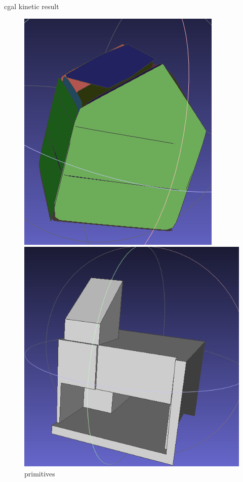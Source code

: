 \documentclass[10pt]{beamer}
\begin{document}
\begin{frame}{cgal kinetic result }
    \begin{figure}[H]
        \centering
        \begin{minipage}[t]{0.35\textwidth}
          \includegraphics[width=\textwidth]{../../images/screen_kinetic/ACJasmin_primitive_cgal.png}
          \caption*{primitives}
        \end{minipage}
        \begin{minipage}[t]{0.41\textwidth}
            \includegraphics[width=\textwidth]{../../images/screen_kinetic/ACJasmin_result_CGAL.png}

\end{minipage}
\end{figure}
\end{frame}
\end{document}
